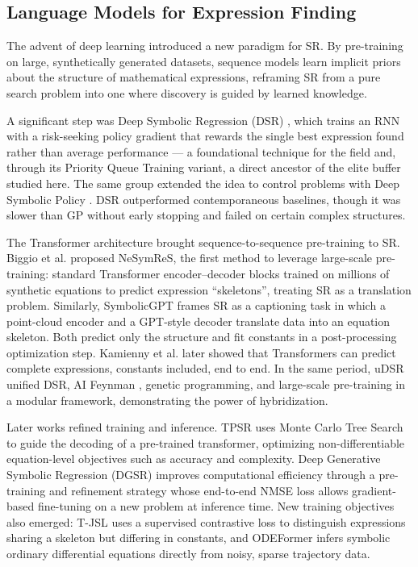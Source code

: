\subsection{Language Models for Expression Finding}
\label{sec:related_lm}

The advent of deep learning introduced a new paradigm for SR. By pre-training on large, synthetically generated datasets, sequence models learn implicit priors about the structure of mathematical expressions, reframing SR from a pure search problem into one where discovery is guided by learned knowledge.

A significant step was Deep Symbolic Regression (DSR) \cite{petersen2020deep}, which trains an RNN with a risk-seeking policy gradient that rewards the single best expression found rather than average performance --- a foundational technique for the field and, through its Priority Queue Training variant, a direct ancestor of the elite buffer studied here. The same group extended the idea to control problems with Deep Symbolic Policy \cite{landajuela_discovering_2021}. DSR outperformed contemporaneous baselines, though it was slower than GP without early stopping and failed on certain complex structures.

The Transformer architecture \cite{vaswani2017_attention_is_all} brought sequence-to-sequence pre-training to SR. Biggio et al. \cite{biggio_neural_2021} proposed NeSymReS, the first method to leverage large-scale pre-training: standard Transformer encoder--decoder blocks trained on millions of synthetic equations to predict expression ``skeletons'', treating SR as a translation problem. Similarly, SymbolicGPT \cite{valipour_symbolicgpt_2021} frames SR as a captioning task in which a point-cloud encoder and a GPT-style decoder translate data into an equation skeleton. Both predict only the structure and fit constants in a post-processing optimization step. Kamienny et al. \cite{kamienny2022end} later showed that Transformers can predict complete expressions, constants included, end to end. In the same period, uDSR \cite{landajuela_unified_2022} unified DSR, AI Feynman \cite{udrescu_ai_2019, ai_feyman2}, genetic programming, and large-scale pre-training in a modular framework, demonstrating the power of hybridization.

Later works refined training and inference. TPSR \cite{shojaee_transformer-based_2023} uses Monte Carlo Tree Search to guide the decoding of a pre-trained transformer, optimizing non-differentiable equation-level objectives such as accuracy and complexity. Deep Generative Symbolic Regression (DGSR) \cite{holt_deep_2023} improves computational efficiency through a pre-training and refinement strategy whose end-to-end NMSE loss allows gradient-based fine-tuning on a new problem at inference time. New training objectives also emerged: T-JSL \cite{li_transformer-based_2023} uses a supervised contrastive loss to distinguish expressions sharing a skeleton but differing in constants, and ODEFormer \cite{dascoli_odeformer_2023} infers symbolic ordinary differential equations directly from noisy, sparse trajectory data.

